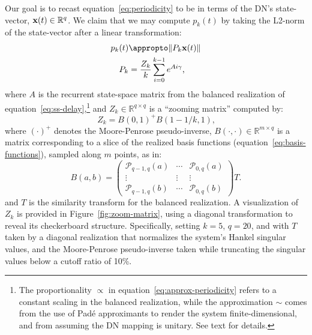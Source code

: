 Our goal is to recast equation~\ref{eq:periodicity} to be in terms of the DN's state-vector, $\mathbf{x}(t) \in \mathbb{R}^q$.
We claim that we may compute $p_k(t)$ by taking the L2-norm of the state-vector after a linear transformation:
\begin{align} \label{eq:approx-periodicity}
p_k(t) &\appropto \| P_k \V{x}(t) \| \\
P_k &= \frac{Z_k}{k} \sum_{i=0}^{k-1} e^{A i \gamma} \text{,} \label{eq:periodicity-matrix}
\end{align}
where $A$ is the recurrent state-space matrix from the balanced realization of equation~\ref{eq:ss-delay},\footnote{%
The proportionality $\propto$ in equation~\ref{eq:approx-periodicity} refers to a constant scaling in the balanced realization, while the approximation $\sim$ comes from the use of Pad\'e approximants to render the system finite-dimensional, and from assuming the DN mapping is unitary.
See text for details.
}
and $Z_k \in \mathbb{R}^{q \times q}$ is a ``zooming matrix'' computed by:
\begin{equation} \label{eq:zoom-matrix}
Z_k = B(0, 1)^+ B(1-1/k, 1) \text{,} %
\end{equation}
where $(\cdot)^+$ denotes the Moore-Penrose pseudo-inverse, $B(\cdot, \cdot) \in \mathbb{R}^{m \times q}$ is a matrix corresponding to a slice of the realized basis functions (equation~\ref{eq:basis-functions}), sampled along $m$ points, as in:
\begin{equation}
B(a, b) = \begin{pmatrix}
\mathcal{P}_{q-1,q}(a) & \cdots & \mathcal{P}_{0,q}(a) \\
\vdots & \vdots & \vdots \\
\mathcal{P}_{q-1,q}(b) & \cdots & \mathcal{P}_{0,q}(b)
\end{pmatrix} T \text{.}
\end{equation}
and $T$ is the similarity transform for the balanced realization.
A visualization of $Z_k$ is provided in Figure~\ref{fig:zoom-matrix}, using a diagonal transformation to reveal its checkerboard structure.
Specifically, setting $k=5$, $q=20$, and with $T$ taken by a diagonal realization that normalizes the system's Hankel singular values, and the Moore-Penrose pseudo-inverse taken while truncating the singular values below a cutoff ratio of 10\%.


